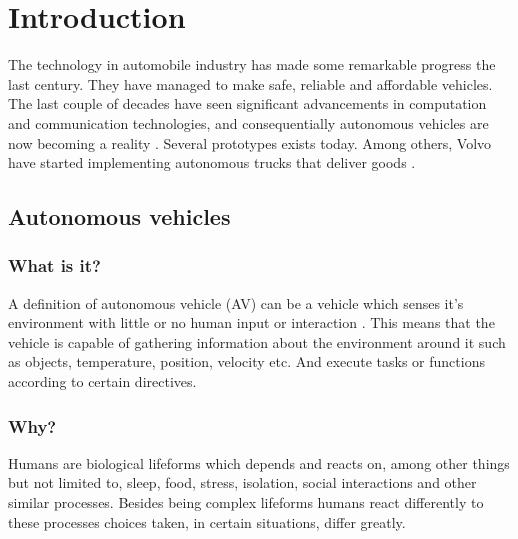\documentclass[conference]{IEEEtran}
\begin{document}

\begin{abstract}
\end{abstract}


%
\IEEEpeerreviewmaketitle

\section{Introduction}
 The technology in automobile industry has made some remarkable progress the last century. They have managed to
 make safe, reliable and affordable vehicles. The last couple of decades have seen significant advancements
 in computation and communication technologies, and consequentially autonomous vehicles are now becoming a reality \cite{IEEE:AutonomousCars}.
 Several prototypes exists today. Among others, Volvo have started implementing autonomous trucks that deliver goods \cite{Volvo2020}.
 \subsection{Autonomous vehicles}
	 \subsubsection{What is it?}
		 A definition of autonomous vehicle (AV) can be a vehicle which senses it's environment with little or no human input or interaction \cite{contributor_2020}.
		 This means that the vehicle is capable of gathering information about the environment around it such as objects, temperature, position, velocity etc. And
		 execute tasks or functions according to certain directives.
	 \subsubsection{Why?}
		 Humans are biological lifeforms which depends and reacts on, among other things but not limited to, sleep, food,
		 stress, isolation, social interactions and other similar processes. Besides being complex lifeforms
		 humans react differently to these processes choices taken, in certain situations, differ greatly.
\end{document}
